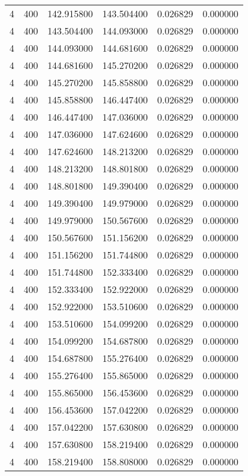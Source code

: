 \begin{longtable}{rrrrrr}
4 & 400 & 142.915800 & 143.504400 & 0.026829 & 0.000000 \\
4 & 400 & 143.504400 & 144.093000 & 0.026829 & 0.000000 \\
4 & 400 & 144.093000 & 144.681600 & 0.026829 & 0.000000 \\
4 & 400 & 144.681600 & 145.270200 & 0.026829 & 0.000000 \\
4 & 400 & 145.270200 & 145.858800 & 0.026829 & 0.000000 \\
4 & 400 & 145.858800 & 146.447400 & 0.026829 & 0.000000 \\
4 & 400 & 146.447400 & 147.036000 & 0.026829 & 0.000000 \\
4 & 400 & 147.036000 & 147.624600 & 0.026829 & 0.000000 \\
4 & 400 & 147.624600 & 148.213200 & 0.026829 & 0.000000 \\
4 & 400 & 148.213200 & 148.801800 & 0.026829 & 0.000000 \\
4 & 400 & 148.801800 & 149.390400 & 0.026829 & 0.000000 \\
4 & 400 & 149.390400 & 149.979000 & 0.026829 & 0.000000 \\
4 & 400 & 149.979000 & 150.567600 & 0.026829 & 0.000000 \\
4 & 400 & 150.567600 & 151.156200 & 0.026829 & 0.000000 \\
4 & 400 & 151.156200 & 151.744800 & 0.026829 & 0.000000 \\
4 & 400 & 151.744800 & 152.333400 & 0.026829 & 0.000000 \\
4 & 400 & 152.333400 & 152.922000 & 0.026829 & 0.000000 \\
4 & 400 & 152.922000 & 153.510600 & 0.026829 & 0.000000 \\
4 & 400 & 153.510600 & 154.099200 & 0.026829 & 0.000000 \\
4 & 400 & 154.099200 & 154.687800 & 0.026829 & 0.000000 \\
4 & 400 & 154.687800 & 155.276400 & 0.026829 & 0.000000 \\
4 & 400 & 155.276400 & 155.865000 & 0.026829 & 0.000000 \\
4 & 400 & 155.865000 & 156.453600 & 0.026829 & 0.000000 \\
4 & 400 & 156.453600 & 157.042200 & 0.026829 & 0.000000 \\
4 & 400 & 157.042200 & 157.630800 & 0.026829 & 0.000000 \\
4 & 400 & 157.630800 & 158.219400 & 0.026829 & 0.000000 \\
4 & 400 & 158.219400 & 158.808000 & 0.026829 & 0.000000 \\

\end{longtable}

